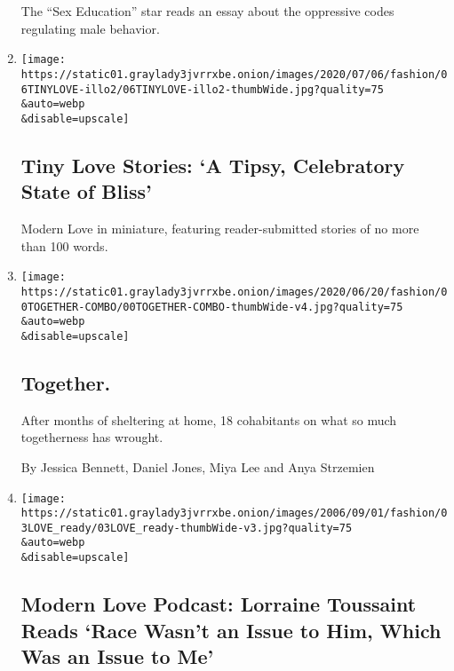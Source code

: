\begin{enumerate}
  The ``Sex Education'' star reads an essay about the oppressive codes
  regulating male behavior.
\item
  \href{/2020/06/16/style/tiny-modern-love-stories-coronavirus-a-tipsy-celebratory-state-of-bliss.html}{}

  \texttt{[image: https://static01.graylady3jvrrxbe.onion/images/2020/07/06/fashion/06TINYLOVE-illo2/06TINYLOVE-illo2-thumbWide.jpg?quality=75\\\&auto=webp\\\&disable=upscale]}

  \hypertarget{tiny-love-stories-a-tipsy-celebratory-state-of-bliss}{%
  \subsection{Tiny Love Stories: `A Tipsy, Celebratory State of
  Bliss'}\label{tiny-love-stories-a-tipsy-celebratory-state-of-bliss}}

  Modern Love in miniature, featuring reader-submitted stories of no
  more than 100 words.
\item
  \href{/2020/06/12/style/modern-love-coronavirus-living-together.html}{}

  \texttt{[image: https://static01.graylady3jvrrxbe.onion/images/2020/06/20/fashion/00TOGETHER-COMBO/00TOGETHER-COMBO-thumbWide-v4.jpg?quality=75\\\&auto=webp\\\&disable=upscale]}

  \hypertarget{together}{%
  \subsection{Together.}\label{together}}

  After months of sheltering at home, 18 cohabitants on what so much
  togetherness has wrought.

  By Jessica Bennett, Daniel Jones, Miya Lee and Anya Strzemien
\item
  \href{/2020/06/10/style/modern-love-podcast-lorraine-toussant-updated-poscript.html}{}

  \texttt{[image: https://static01.graylady3jvrrxbe.onion/images/2006/09/01/fashion/03LOVE\_ready/03LOVE\_ready-thumbWide-v3.jpg?quality=75\\\&auto=webp\\\&disable=upscale]}

  \hypertarget{modern-love-podcast-lorraine-toussaint-reads-race-wasnt-an-issue-to-him-which-was-an-issue-to-me}{%
  \subsection{Modern Love Podcast: Lorraine Toussaint Reads `Race Wasn't
  an Issue to Him, Which Was an Issue to
  Me'}\label{modern-love-podcast-lorraine-toussaint-reads-race-wasnt-an-issue-to-him-which-was-an-issue-to-me}}


\end{enumerate}

